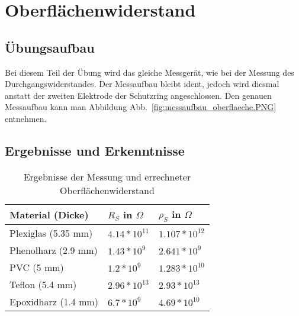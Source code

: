 \documentclass[a4paper,twoside,12pt,DIV=13,BCOR=5mm,numbers=noenddot,cleardoublepage=empty]{scrbook}
\begin{document}
        \section{Oberfl\"achenwiderstand}
            \subsection{\"Ubungsaufbau}
            Bei diesem Teil der \"Ubung wird das gleiche Messgerät, wie bei der Messung des Durchgangswiderstandes.
            Der Messaufbau bleibt ident, jedoch wird diesmal anstatt der zweiten Elektrode
            der Schutzring angeschlossen. Den genauen Messaufbau kann man Abbildung Abb.~\ref{fig:messaufbau_oberflaeche.PNG} entnehmen.
            \subsection{Ergebnisse und Erkenntnisse}
            \begin{table}[h]
                \begin{center}
                    \begin{tabular}{|l||l|l|}
                        \hline
                        Material (Dicke) & $R_S$ in $\Omega$ & $\rho_S$ in $\Omega$ \\
                        \hline
                        \hline
                        Plexiglas (5.35 mm) & $4.14*10^{11}$ & $1.107*10^{12}$ \\
                        \hline
                        Phenolharz (2.9 mm) & $1.43*10^{9}$ & $2.641*10^{9}$ \\
                        \hline
                        PVC (5 mm) & $1.2*10^{9}$ & $1.283*10^{10}$ \\
                        \hline
                        Teflon (5.4 mm) & $2.96*10^{13}$ & $2.93*10^{13}$ \\
                        \hline
                        Epoxidharz (1.4 mm) & $6.7*10^{9}$ & $4.69*10^{10}$ \\
                        \hline
                    \end{tabular}
                    \caption{Ergebnisse der Messung und errechneter Oberfl\"achenwiderstand}
                    \label{tab:table3}
                \end{center}
            \end{table}
\end{document}
